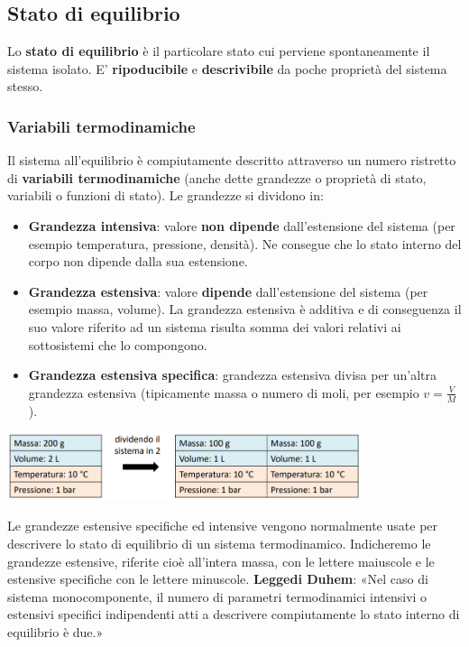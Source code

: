 \subsection{Stato di equilibrio}
Lo \textbf{stato di equilibrio} è il particolare stato cui perviene spontaneamente il sistema isolato.\newline
\newline
E' \textbf{ripoducibile} e \textbf{descrivibile} da poche proprietà del sistema stesso.
\subsubsection{Variabili termodinamiche}
Il sistema all’equilibrio è compiutamente descritto attraverso un numero ristretto di \textbf{variabili termodinamiche} (anche dette grandezze o proprietà di stato, variabili o funzioni di stato).\newline
\newline
Le grandezze si dividono in:
\begin{itemize}
    \item \textbf{Grandezza intensiva}: valore \textbf{non dipende} dall'estensione del sistema (per esempio temperatura, pressione, densità). Ne
    consegue che lo stato interno del corpo non dipende dalla sua estensione.
    \item \textbf{Grandezza estensiva}: valore \textbf{dipende} dall'estensione del sistema (per esempio massa, volume). La grandezza
    estensiva è additiva e di conseguenza il suo valore riferito ad un sistema
    risulta somma dei valori relativi ai sottosistemi che lo compongono.
    \item \textbf{Grandezza estensiva specifica}: grandezza estensiva divisa per un'altra grandezza estensiva (tipicamente massa o numero di moli, per esempio $v = \frac{V}{M}$).
\end{itemize}
\begin{center}
    \includegraphics[height=2cm]{../L01/img1.PNG}
\end{center}
Le grandezze estensive specifiche ed intensive vengono normalmente usate per descrivere lo stato di equilibrio di un sistema termodinamico.\newline
\newline
Indicheremo le grandezze estensive, riferite cioè all'intera massa, con le lettere maiuscole e le estensive specifiche con le lettere minuscole.\newline
\newline
\textbf{Leggedi Duhem}:\newline
«Nel caso di sistema monocomponente, il numero di parametri termodinamici intensivi o estensivi specifici indipendenti atti a descrivere compiutamente lo stato interno di equilibrio è due.»
